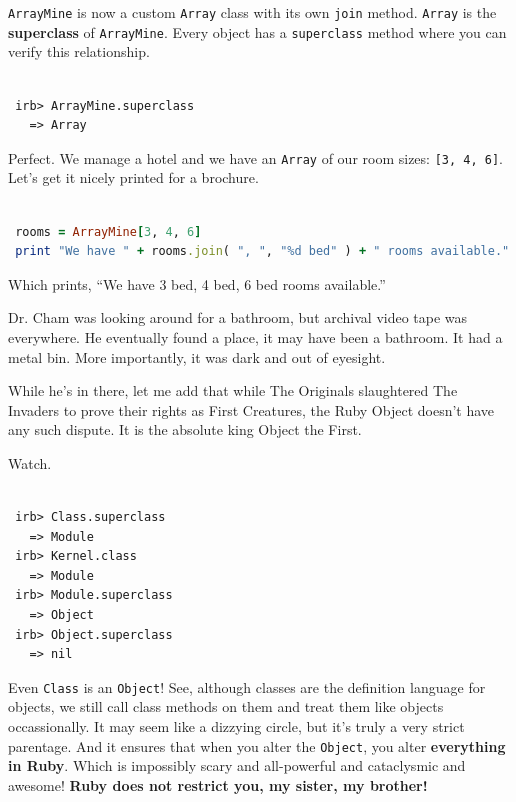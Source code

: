 \documentclass[10pt,twoside]{report}
\begin{document}
\lstinline[breaklines=true]|ArrayMine| is now a custom
\lstinline[breaklines=true]|Array| class with its own
\lstinline[breaklines=true]|join| method.
\lstinline[breaklines=true]|Array| is the {\bf superclass} of
\lstinline[breaklines=true]|ArrayMine|.  Every object has a
\lstinline[breaklines=true]|superclass| method where you can verify
this relationship.


\begin{lstlisting}

 irb> ArrayMine.superclass
   => Array

\end{lstlisting}


Perfect.  We manage a hotel and we have an
\lstinline[breaklines=true]|Array| of our room sizes:
\lstinline[breaklines=true]|[3, 4, 6]|. Let's get it nicely printed
for a brochure.


\begin{lstlisting}[basicstyle=\ttfamily\color{basiccolor},
    commentstyle = \ttfamily\color{commentcolor},
    keywordstyle=\ttfamily\color{keywordscolor},
    stringstyle=\color{stringcolor},
    language=Ruby,
    basicstyle=\small\ttfamily,
    showstringspaces=false,
  ]

 rooms = ArrayMine[3, 4, 6]
 print "We have " + rooms.join( ", ", "%d bed" ) + " rooms available."

\end{lstlisting}


Which prints, ``We have 3 bed, 4 bed, 6 bed rooms available.''

Dr. Cham was looking around for a bathroom, but archival video tape
was everywhere. He eventually found a place, it may have been a
bathroom.  It had a metal bin. More importantly, it was dark and out
of eyesight.

While he's in there, let me add that while The Originals slaughtered
The Invaders to prove their rights as First Creatures, the Ruby Object
doesn't have any such dispute.  It is the absolute king Object the
First.

Watch.


\begin{lstlisting}

 irb> Class.superclass
   => Module
 irb> Kernel.class
   => Module
 irb> Module.superclass
   => Object
 irb> Object.superclass
   => nil

\end{lstlisting}


Even \lstinline[breaklines=true]|Class| is an
\lstinline[breaklines=true]|Object|!  See, although classes are the
definition language for objects, we still call class methods on them
and treat them like objects occassionally.  It may seem like a
dizzying circle, but it's truly a very strict parentage.  And it
ensures that when you alter the \lstinline[breaklines=true]|Object|,
you alter {\bf everything in Ruby}.  Which is impossibly scary and
all-powerful and cataclysmic and awesome!  {\bf Ruby does not restrict
  you, my sister, my brother!}
\end{document}

